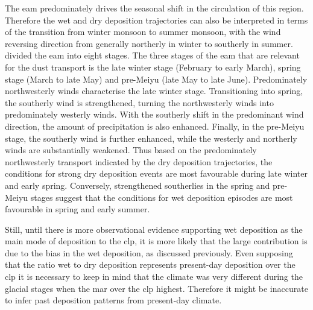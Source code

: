 The \acrfull{eam} predominately drives the seasonal shift in the circulation of this region. 
Therefore the wet and dry deposition trajectories can also be interpreted in terms of the transition from winter monsoon to summer monsoon, with the wind reversing direction from generally northerly in winter to southerly in summer. \textcite{dai2021define} divided the \acrshort{eam} into eight stages. 
The three stages of the \acrshort{eam} that are relevant for the dust transport is the late winter stage (February to early March), spring stage (March to late May) and pre-Meiyu (late May to late June). 
Predominately northwesterly winds characterise the late winter stage. 
Transitioning into spring, the southerly wind is strengthened, turning the northwesterly  winds into  predominately westerly winds. 
With the southerly shift in the predominant wind direction, the amount of precipitation is also enhanced. 
Finally, in the pre-Meiyu stage, the southerly wind is further enhanced, while the westerly and northerly winds are substantially weakened. 
Thus based on the predominately northwesterly transport indicated by the dry deposition trajectories, the conditions for strong dry deposition events are most favourable during late winter and early spring.
Conversely, strengthened southerlies in the spring and pre-Meiyu stages suggest that the conditions for wet deposition episodes are most favourable in spring and early summer.         

Still, until there is more observational evidence supporting wet deposition as the main mode of deposition to the \acrshort{clp}, it is more likely that the large contribution is due to the bias in the wet deposition, as discussed previously.
Even supposing that the ratio wet to dry deposition represents present-day deposition over the \acrshort{clp} it is necessary to keep in mind that the climate was very different during the glacial stages when the \acrshort{mar} over the \acrshort{clp} highest. 
Therefore it might be inaccurate to infer past deposition patterns from present-day climate.  

